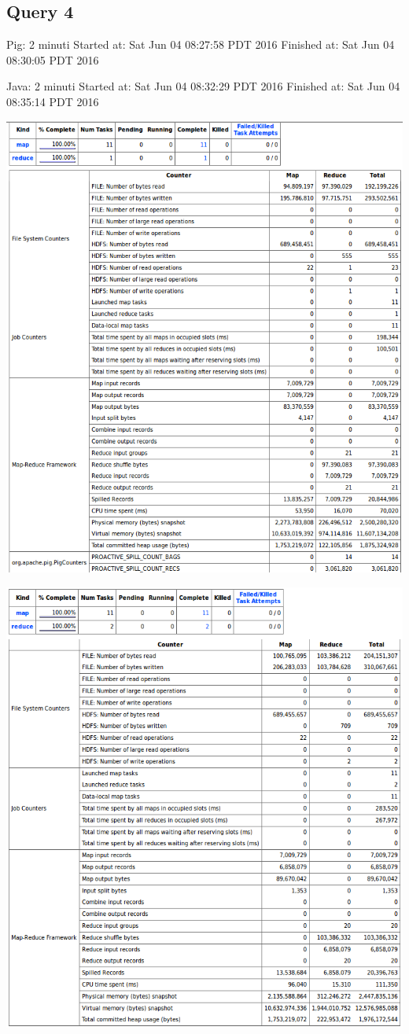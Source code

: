 \documentclass[11pt]{article} %
\begin{document}
\subsection{Query 4}
Pig: 2 minuti	 Started at: Sat Jun 04 08:27:58 PDT 2016	 Finished at: Sat Jun 04 08:30:05 PDT 2016

Java: 2 minuti	 Started at: Sat Jun 04 08:32:29 PDT 2016	 Finished at: Sat Jun 04 08:35:14 PDT 2016

\includegraphics[scale=0.8]{pig4.png}

\includegraphics[scale=0.8]{java4.png}
\end{document}
